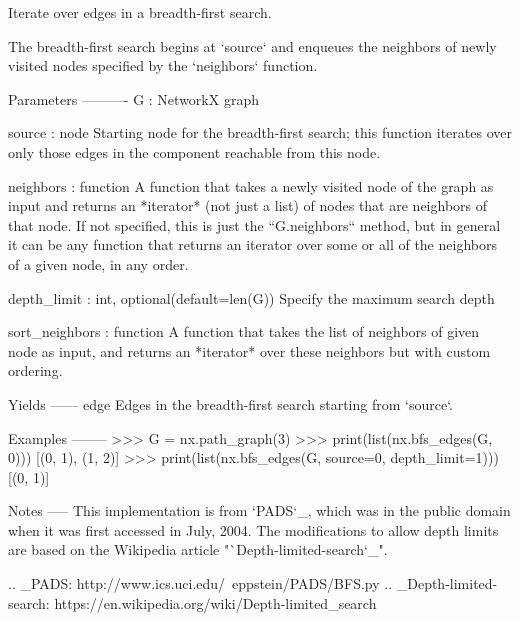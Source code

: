 \begin{DoxyVerb}Iterate over edges in a breadth-first search.

The breadth-first search begins at `source` and enqueues the
neighbors of newly visited nodes specified by the `neighbors`
function.

Parameters
----------
G : NetworkX graph

source : node
    Starting node for the breadth-first search; this function
    iterates over only those edges in the component reachable from
    this node.

neighbors : function
    A function that takes a newly visited node of the graph as input
    and returns an *iterator* (not just a list) of nodes that are
    neighbors of that node. If not specified, this is just the
    ``G.neighbors`` method, but in general it can be any function
    that returns an iterator over some or all of the neighbors of a
    given node, in any order.

depth_limit : int, optional(default=len(G))
    Specify the maximum search depth

sort_neighbors : function
    A function that takes the list of neighbors of given node as input, and
    returns an *iterator* over these neighbors but with custom ordering.

Yields
------
edge
    Edges in the breadth-first search starting from `source`.

Examples
--------
>>> G = nx.path_graph(3)
>>> print(list(nx.bfs_edges(G, 0)))
[(0, 1), (1, 2)]
>>> print(list(nx.bfs_edges(G, source=0, depth_limit=1)))
[(0, 1)]

Notes
-----
This implementation is from `PADS`_, which was in the public domain
when it was first accessed in July, 2004.  The modifications
to allow depth limits are based on the Wikipedia article
"`Depth-limited-search`_".

.. _PADS: http://www.ics.uci.edu/~eppstein/PADS/BFS.py
.. _Depth-limited-search: https://en.wikipedia.org/wiki/Depth-limited_search
\end{DoxyVerb}
 